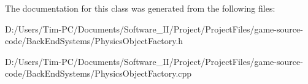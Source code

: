The documentation for this class was generated from the following files\+:\begin{DoxyCompactItemize}
\item 
D\+:/\+Users/\+Tim-\/\+P\+C/\+Documents/\+Software\+\_\+\+I\+I/\+Project/\+Project\+Files/game-\/source-\/code/\+Back\+End\+Systems/Physics\+Object\+Factory.\+h\item 
D\+:/\+Users/\+Tim-\/\+P\+C/\+Documents/\+Software\+\_\+\+I\+I/\+Project/\+Project\+Files/game-\/source-\/code/\+Back\+End\+Systems/Physics\+Object\+Factory.\+cpp\end{DoxyCompactItemize}
